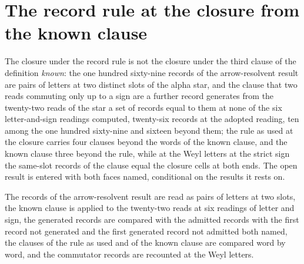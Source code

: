 \section{The record rule at the closure from the known clause}\label{mod:I-5-D538628-w-lrkc}
\begin{chwall}\label{box:I-5-D538628-w-lrkc:1}
The closure under the record rule is not the closure under the third clause of the definition \emph{known}: the one hundred sixty-nine records of the arrow-resolvent result are pairs of letters at two distinct slots of the alpha star, and the clause that two reads commuting only up to a sign are a further record generates from the twenty-two reads of the star a set of records equal to them at none of the six letter-and-sign readings computed, twenty-six records at the adopted reading, ten among the one hundred sixty-nine and sixteen beyond them; the rule as used at the closure carries four clauses beyond the words of the known clause, and the known clause three beyond the rule, while at the Weyl letters at the strict sign the same-slot records of the clause equal the closure cells at both ends. The open result is entered with both faces named, conditional on the results it rests on.
\end{chwall}
The records of the arrow-resolvent result are read as pairs of letters at two slots, the known clause is applied to the twenty-two reads at six readings of letter and sign, the generated records are compared with the admitted records with the first record not generated and the first generated record not admitted both named, the clauses of the rule as used and of the known clause are compared word by word, and the commutator records are recounted at the Weyl letters.

